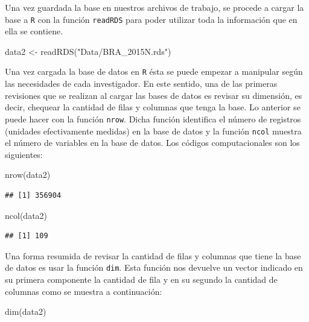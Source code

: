 \documentclass[
  12pt,
]{book}
\newenvironment{Shaded}{\begin{snugshade}}{\end{snugshade}}
\newcommand{\FunctionTok}[1]{\textcolor[rgb]{0.00,0.00,0.00}{#1}}
\newcommand{\NormalTok}[1]{#1}
\newcommand{\OtherTok}[1]{\textcolor[rgb]{0.56,0.35,0.01}{#1}}
\newcommand{\StringTok}[1]{\textcolor[rgb]{0.31,0.60,0.02}{#1}}
\begin{document}
Una vez guardada la base en nuestros archivos de trabajo, se procede a cargar la base a \texttt{R} con la función \texttt{readRDS} para poder utilizar toda la información que en ella se contiene.

\begin{Shaded}
\begin{Highlighting}[]
\NormalTok{data2 }\OtherTok{\textless{}{-}} \FunctionTok{readRDS}\NormalTok{(}\StringTok{"Data/BRA\_2015N.rds"}\NormalTok{)}
\end{Highlighting}
\end{Shaded}

Una vez cargada la base de datos en \texttt{R} ésta se puede empezar a manipular según las necesidades de cada investigador. En este sentido, una de las primeras revisiones que se realizan al cargar las bases de datos es revisar su dimensión, es decir, chequear la cantidad de filas y columnas que tenga la base. Lo anterior se puede hacer con la función \texttt{nrow}. Dicha función identifica el número de registros (unidades efectivamente medidas) en la base de datos y la función \texttt{ncol} muestra el número de variables en la base de datos. Los códigos computacionales son los siguientes:

\begin{Shaded}
\begin{Highlighting}[]
\FunctionTok{nrow}\NormalTok{(data2)}
\end{Highlighting}
\end{Shaded}

\begin{verbatim}
## [1] 356904
\end{verbatim}

\begin{Shaded}
\begin{Highlighting}[]
\FunctionTok{ncol}\NormalTok{(data2)}
\end{Highlighting}
\end{Shaded}

\begin{verbatim}
## [1] 109
\end{verbatim}

Una forma resumida de revisar la cantidad de filas y columnas que tiene la base de datos es usar la función \texttt{dim}. Esta función nos devuelve un vector indicado en su primera componente la cantidad de fila y en su segundo la cantidad de columnas como se muestra a continuación:

\begin{Shaded}
\begin{Highlighting}[]
\FunctionTok{dim}\NormalTok{(data2)}
\end{Highlighting}
\end{Shaded}
\end{document}
